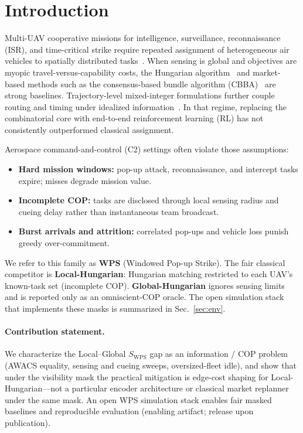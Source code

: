 \documentclass[journal,twocolumn,10pt]{IEEEtran}
\begin{document}
\section{Introduction}
Multi-UAV cooperative missions for intelligence, surveillance, reconnaissance (ISR), and time-critical strike require repeated assignment of heterogeneous air vehicles to spatially distributed tasks~\cite{poudel2022survey,shima2006multiple}.
When sensing is global and objectives are myopic travel-versus-capability costs, the Hungarian algorithm~\cite{kuhn1955hungarian} and market-based methods such as the consensus-based bundle algorithm (CBBA)~\cite{choi2009cbba,dias2006market} are strong baselines.
Trajectory-level mixed-integer formulations further couple routing and timing under idealized information~\cite{richards2002aircraft}.
In that regime, replacing the combinatorial core with end-to-end reinforcement learning (RL) has not consistently outperformed classical assignment.

Aerospace command-and-control (C2) settings often violate those assumptions:
\begin{itemize}
  \item \textbf{Hard mission windows:} pop-up attack, reconnaissance, and intercept tasks expire; misses degrade mission value.
  \item \textbf{Incomplete COP:} tasks are disclosed through local sensing radius and cueing delay rather than instantaneous team broadcast.
  \item \textbf{Burst arrivals and attrition:} correlated pop-ups and vehicle loss punish greedy over-commitment.
\end{itemize}
We refer to this family as \textbf{WPS} (Windowed Pop-up Strike).
The fair classical competitor is \textbf{Local-Hungarian}: Hungarian matching restricted to each UAV's known-task set (incomplete COP).
\textbf{Global-Hungarian} ignores sensing limits and is reported only as an omniscient-COP oracle.
The open simulation stack that implements these masks is summarized in Sec.~\ref{sec:env}.

\paragraph{Contribution statement.}
We characterize the Local--Global \(S_{\mathrm{WPS}}\) gap as an information / COP problem (AWACS equality, sensing and cueing sweeps, oversized-fleet idle), and show that under the visibility mask the practical mitigation is edge-cost shaping for Local-Hungarian---not a particular encoder architecture or classical market replanner under the same mask.
An open WPS simulation stack enables fair masked baselines and reproducible evaluation (enabling artifact; release upon publication).
\end{document}
